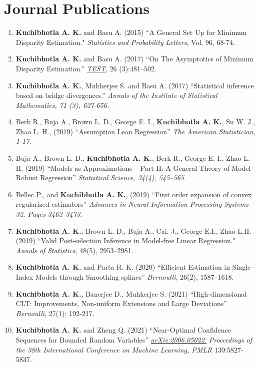 \documentclass[10pt]{article}
\numberwithin{myalgctr}{section}
\begin{document}
\section*{Journal Publications}
\begin{enumerate}\itemsep0em
\item \textbf{Kuchibhotla A. K.} and Basu A. (2015) ``A General Set Up for Minimum Disparity Estimation." \emph{Statistics and Probability Letters},  Vol. 96, 68-74.
\item \textbf{Kuchibhotla A. K.} and Basu A. (2017) ``On The Asymptotics of Minimum Disparity Estimation.'' \href{https://www.springer.com/journal/11749}{\emph{TEST}}, 26 (3):481--502.  
\item \textbf{Kuchibhotla A. K.}, Mukherjee S. and Basu A. (2017) ``Statistical inference based on bridge divergences.'' \emph{Annals of the Institute of Statistical Mathematics, 71 (3), 627-656.}
\item Berk R., Buja A., Brown L. D., George E. I., \textbf{Kuchibhotla A. K.}, Su W. J., Zhao L. H., (2019) ``Assumption Lean Regression'' \emph{The American Statistician, 1-17.}
\item Buja A., Brown L. D., \textbf{Kuchibhotla A. K.}, Berk R., George E. I., Zhao L. H. (2019) ``Models as Approximations -- Part II: A General Theory of Model-Robust Regression'' \emph{Statistical Science, 34(4), 545--565.}
\item Bellec P., and \textbf{Kuchibhotla A. K.}, (2019) ``First order expansion of convex regularized estimators'' \emph{Advances in Neural Information Processing Systems 32. Pages 3462--3473.}
\item \textbf{Kuchibhotla A. K.}, Brown L. D., Buja A., Cai, J., George E.I., Zhao L.H. (2019) ``Valid Post-selection Inference in Model-free Linear Regression." \emph{Annals of Statistics}, 48(5), 2953--2981.
\item \textbf{Kuchibhotla A. K.} and Parta R. K. (2020) ``Efficient Estimation in Single Index Models through Smoothing splines'' \emph{Bernoulli}, 26(2), 1587--1618.
\item \textbf{Kuchibhotla A. K.}, Banerjee D., Muhkerjee S. (2021) ``High-dimensional CLT: Improvements, Non-uniform Extensions and Large Deviations'' \emph{Bernoulli}, 27(1): 192-217.
	\item \textbf{Kuchibhotla A. K.} and Zheng Q. (2021) ``Near-Optimal Confidence Sequences for Bounded Random Variables'' \href{https://arxiv.org/abs/2006.05022}{\emph{arXiv:2006.05022.}} \emph{Proceedings of the 38th International Conference on Machine Learning, PMLR} 139:5827-5837.

\end{enumerate}
\end{document}
